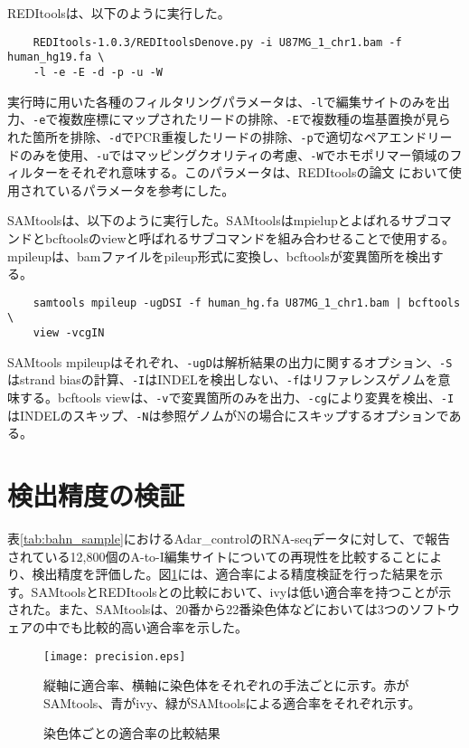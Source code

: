 REDItoolsは、以下のように実行した。
{\small
\begin{verbatim}
	REDItools-1.0.3/REDItoolsDenove.py -i U87MG_1_chr1.bam -f human_hg19.fa \
	-l -e -E -d -p -u -W
\end{verbatim}
}
実行時に用いた各種のフィルタリングパラメータは、\texttt{-l}で編集サイトのみを出力、\texttt{-e}で複数座標にマップされたリードの排除、\texttt{-E}で複数種の塩基置換が見られた箇所を排除、\texttt{-d}でPCR重複したリードの排除、\texttt{-p}で適切なペアエンドリードのみを使用、\texttt{-u}ではマッピングクオリティの考慮、\texttt{-W}でホモポリマー領域のフィルターをそれぞれ意味する。このパラメータは、REDItoolsの論文 \cite{Picardi:2013aa}において使用されているパラメータを参考にした。

SAMtoolsは、以下のように実行した。SAMtoolsはmpielupとよばれるサブコマンドとbcftoolsのviewと呼ばれるサブコマンドを組み合わせることで使用する。mpileupは、bamファイルをpileup形式に変換し、bcftoolsが変異箇所を検出する。
{\small
\begin{verbatim}
	samtools mpileup -ugDSI -f human_hg.fa U87MG_1_chr1.bam | bcftools \
	view -vcgIN
\end{verbatim}
}
SAMtools mpileupはそれぞれ、\texttt{-ugD}は解析結果の出力に関するオプション、\texttt{-S}はstrand biasの計算、\texttt{-I}はINDELを検出しない、\texttt{-f}はリファレンスゲノムを意味する。bcftools viewは、\texttt{-v}で変異箇所のみを出力、\texttt{-cg}により変異を検出、\texttt{-I}はINDELのスキップ、\texttt{-N}は参照ゲノムがNの場合にスキップするオプションである。

\section{検出精度の検証}
表\ref{tab:bahn_sample}におけるAdar\_controlのRNA-seqデータに対して、\cite{BahLeeLi1201}で報告されている12,800個のA-to-I編集サイトについての再現性を比較することにより、検出精度を評価した。図\ref{fig:precision}には、適合率による精度検証を行った結果を示す。SAMtoolsとREDItoolsとの比較において、ivyは低い適合率を持つことが示された。また、SAMtoolsは、20番から22番染色体などにおいては3つのソフトウェアの中でも比較的高い適合率を示した。
\begin{figure}[!ht]
	\begin{center}
		\texttt{[image: precision.eps]}
	\end{center}
	\caption{染色体ごとの適合率の比較結果}
	\begin{flushleft}
		\small{縦軸に適合率、横軸に染色体をそれぞれの手法ごとに示す。赤がSAMtools、青がivy、緑がSAMtoolsによる適合率をそれぞれ示す。}
	\end{flushleft}
	\label{fig:precision}
\end{figure}

